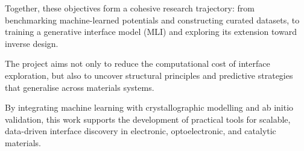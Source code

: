 \label{para:objectives_summary} %

Together, these objectives form a cohesive research trajectory: from benchmarking machine-learned potentials and
constructing curated datasets, to training a generative interface model (MLI) and exploring its extension toward inverse
design\nocite{}.

The project aims not only to reduce the computational cost of interface exploration, but also to uncover structural
principles and predictive strategies that generalise across materials systems\nocite{}.

\label{para:objectives_impact} %

By integrating machine learning with crystallographic modelling and ab initio validation, this work supports the
development of practical tools for scalable, data-driven interface discovery in electronic, optoelectronic, and
catalytic materials\nocite{}.

